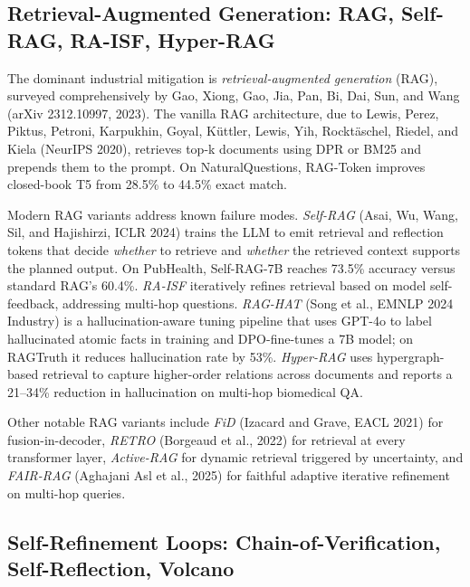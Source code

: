 \documentclass{article}
\begin{document}
\subsection{Retrieval-Augmented Generation: RAG, Self-RAG, RA-ISF, Hyper-RAG}\label{retrieval-augmented-generation-rag-self-rag-ra-isf-hyper-rag}

The dominant industrial mitigation is \emph{retrieval-augmented generation} (RAG), surveyed comprehensively by Gao, Xiong, Gao, Jia, Pan, Bi, Dai, Sun, and Wang (arXiv 2312.10997, 2023). The vanilla RAG architecture, due to Lewis, Perez, Piktus, Petroni, Karpukhin, Goyal, Küttler, Lewis, Yih, Rocktäschel, Riedel, and Kiela (NeurIPS 2020), retrieves top-k documents using DPR or BM25 and prepends them to the prompt. On NaturalQuestions, RAG-Token improves closed-book T5 from 28.5\% to 44.5\% exact match.

Modern RAG variants address known failure modes. \emph{Self-RAG} (Asai, Wu, Wang, Sil, and Hajishirzi, ICLR 2024) trains the LLM to emit retrieval and reflection tokens that decide \emph{whether} to retrieve and \emph{whether} the retrieved context supports the planned output. On PubHealth, Self-RAG-7B reaches 73.5\% accuracy versus standard RAG's 60.4\%. \emph{RA-ISF} \citep{liu2024raisflearningtoans} iteratively refines retrieval based on model self-feedback, addressing multi-hop questions. \emph{RAG-HAT} (Song et al., EMNLP 2024 Industry) is a hallucination-aware tuning pipeline that uses GPT-4o to label hallucinated atomic facts in training and DPO-fine-tunes a 7B model; on RAGTruth it reduces hallucination rate by 53\%. \emph{Hyper-RAG} \citep{feng2026hyperragcombatingl} uses hypergraph-based retrieval to capture higher-order relations across documents and reports a 21--34\% reduction in hallucination on multi-hop biomedical QA.

Other notable RAG variants include \emph{FiD} (Izacard and Grave, EACL 2021) for fusion-in-decoder, \emph{RETRO} (Borgeaud et al., 2022) for retrieval at every transformer layer, \emph{Active-RAG} \citep{jiang2024asurveyonlargelang} for dynamic retrieval triggered by uncertainty, and \emph{FAIR-RAG} (Aghajani Asl et al., 2025) for faithful adaptive iterative refinement on multi-hop queries.

\subsection{Self-Refinement Loops: Chain-of-Verification, Self-Reflection, Volcano}\label{self-refinement-loops-chain-of-verification-self-reflection-volcano}
\end{document}
